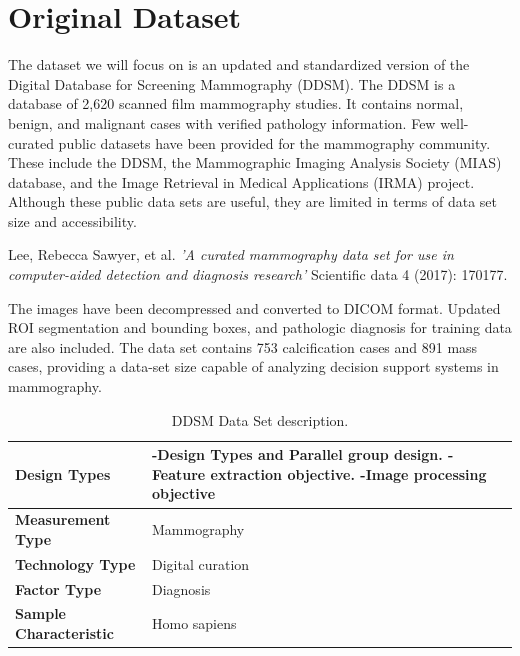 \documentclass{book}
\begin{document}
    \section{Original Dataset}
        The dataset we will focus on is an updated and standardized version of the Digital Database for Screening Mammography (DDSM). The DDSM is a database of 2,620 scanned film mammography studies. It contains normal, benign, and malignant cases with verified pathology information. Few well-curated public datasets have been provided for the mammography community. These include the DDSM, the Mammographic Imaging Analysis Society (MIAS) database, and the Image Retrieval in Medical Applications (IRMA) project. Although these public data sets are useful, they are limited in terms of data set size and accessibility.

        \begin{center}
            \begin{minipage}{0.9\linewidth}
                \vspace{5pt}%
                {\small
                    Lee, Rebecca Sawyer, et al. \textit{'A curated mammography data set for use in computer-aided detection and diagnosis research'} Scientific data 4 (2017): 170177.
                }
                \vspace{5pt}%
            \end{minipage}
        \end{center}

        The images have been decompressed and converted to DICOM format. Updated ROI segmentation and bounding boxes, and pathologic diagnosis for training data are also included. The data set contains 753 calcification cases and 891 mass cases, providing a data-set size capable of analyzing decision support systems in mammography.

        
        \begin{table}
            \begin{tabular}{m{5cm}   m{8cm} }
                \midrule
                \textbf{Design Types} & -Design Types and Parallel group design.  -Feature extraction objective.  -Image processing objective \\
                \midrule
                \textbf{Measurement Type} & Mammography \\ 
                \midrule
                \textbf{Technology Type} & Digital curation \\ 
                \midrule
                \textbf{Factor Type} & Diagnosis \\
                \midrule
                \textbf{Sample Characteristic} & Homo sapiens\\
                \midrule
            \end{tabular}
            \caption{\label{tab:DDSM}DDSM Data Set description.}
        \end{table}
\end{document}
